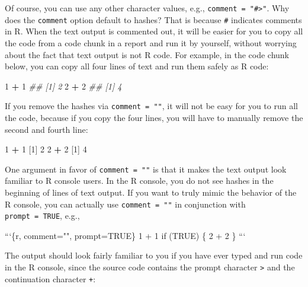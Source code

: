 \documentclass[
  11pt,
]{krantz}
\newenvironment{Shaded}{\begin{snugshade}}{\end{snugshade}}
\newcommand{\BaseNTok}[1]{\textcolor[rgb]{0.06,0.06,0.06}{#1}}
\newcommand{\CommentTok}[1]{\textcolor[rgb]{0.37,0.37,0.37}{\textit{#1}}}
\newcommand{\DecValTok}[1]{\textcolor[rgb]{0.06,0.06,0.06}{#1}}
\newcommand{\NormalTok}[1]{#1}
\newcommand{\OperatorTok}[1]{\textcolor[rgb]{0.43,0.43,0.43}{\textbf{#1}}}
\newcommand{\StringTok}[1]{\textcolor[rgb]{0.5,0.5,0.5}{#1}}
\begin{document}
Of course, you can use any other character values, e.g., \texttt{comment\ =\ "\#\textgreater{}"}. Why does the \texttt{comment} option default to hashes? That is because \texttt{\#} indicates comments in R. When the text output is commented out, it will be easier for you to copy all the code from a code chunk in a report and run it by yourself, without worrying about the fact that text output is not R code. For example, in the code chunk below, you can copy all four lines of text and run them safely as R code:

\begin{Shaded}
\begin{Highlighting}[]
\DecValTok{1} \OperatorTok{+}\StringTok{ }\DecValTok{1}
\CommentTok{## [1] 2}
\DecValTok{2} \OperatorTok{+}\StringTok{ }\DecValTok{2}
\CommentTok{## [1] 4}
\end{Highlighting}
\end{Shaded}

If you remove the hashes via \texttt{comment\ =\ ""}, it will not be easy for you to run all the code, because if you copy the four lines, you will have to manually remove the second and fourth line:

\begin{Shaded}
\begin{Highlighting}[]
\DecValTok{1} \OperatorTok{+}\StringTok{ }\DecValTok{1}
\NormalTok{[}\DecValTok{1}\NormalTok{] }\DecValTok{2}
\DecValTok{2} \OperatorTok{+}\StringTok{ }\DecValTok{2}
\NormalTok{[}\DecValTok{1}\NormalTok{] }\DecValTok{4}
\end{Highlighting}
\end{Shaded}

One argument in favor of \texttt{comment\ =\ ""} is that it makes the text output look familiar to R console users. In the R console, you do not see hashes in the beginning of lines of text output. If you want to truly mimic the behavior of the R console, you can actually use \texttt{comment\ =\ ""} in conjunction with \texttt{prompt\ =\ TRUE}, e.g.,

\begin{Shaded}
\begin{Highlighting}[]
\BaseNTok{```\{r, comment="", prompt=TRUE\}}
\BaseNTok{1 + 1}
\BaseNTok{if (TRUE) \{}
\BaseNTok{  2 + 2}
\BaseNTok{\}}
\BaseNTok{```}
\end{Highlighting}
\end{Shaded}

The output should look fairly familiar to you if you have ever typed and run code in the R console, since the source code contains the prompt character \texttt{\textgreater{}} and the continuation character \texttt{+}:
\end{document}

